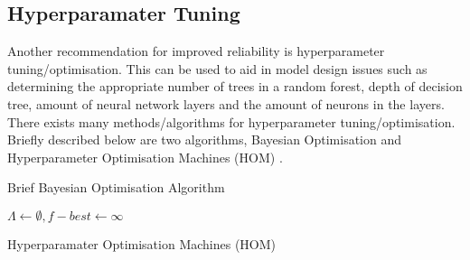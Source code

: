 \subsection{Hyperparamater Tuning}
Another recommendation for improved reliability is hyperparameter tuning/optimisation.
This can be used to aid in model design issues such as determining the appropriate number of trees in a random forest,
depth of decision tree, amount of neural network layers and the amount of neurons in the layers.
There exists many methods/algorithms for hyperparameter tuning/optimisation. 
Briefly described below are two algorithms, Bayesian Optimisation \cite{7900023} and Hyperparameter Optimisation Machines (HOM) \cite{7796889}.

\begin{algorithm}[H]
    \SetAlgoLined
    \caption{Brief Bayesian Optimisation Algorithm \cite{7900023}}
\end{algorithm}

\begin{algorithm}[H]
    \SetAlgoLined
    $\Lambda \leftarrow \emptyset, f-{best} \leftarrow \infty$\\

    
    \caption{Hyperparamater Optimisation Machines (HOM) }%
\end{algorithm}

